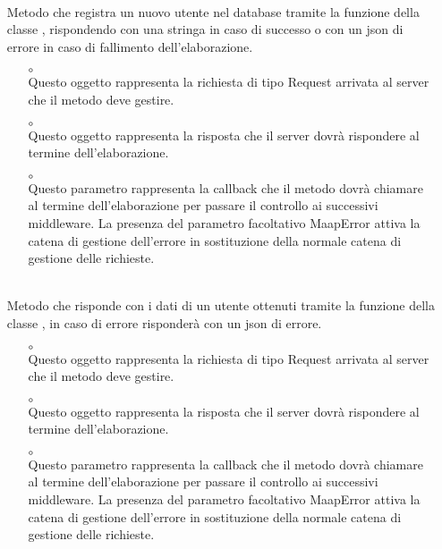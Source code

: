 \begin{itemize}
\begin{itemize}
\end{itemize}
\item[]  \\ Metodo che registra un nuovo utente nel database tramite la funzione  della classe , rispondendo con una stringa in caso di successo o con un json di errore in caso di fallimento dell'elaborazione.
\begin{itemize}\addtolength{\itemsep}{-0.5\baselineskip}
\item[$\circ$]  \\ Questo oggetto rappresenta la richiesta di tipo Request arrivata al server che il metodo deve gestire.
\item[$\circ$]  \\ Questo oggetto rappresenta la risposta che il server dovrà rispondere al termine dell'elaborazione.
\item[$\circ$]  \\ Questo parametro rappresenta la callback che il metodo dovrà chiamare al termine dell'elaborazione per passare il controllo ai successivi middleware. La presenza del parametro facoltativo MaapError attiva la catena di gestione dell'errore in sostituzione della normale catena di gestione delle richieste.
\end{itemize}
\item[]  \\ Metodo che risponde con i dati di un utente ottenuti tramite la funzione  della classe , in caso di errore risponderà con un json di errore.
\begin{itemize}\addtolength{\itemsep}{-0.5\baselineskip}
\item[$\circ$]  \\ Questo oggetto rappresenta la richiesta di tipo Request arrivata al server che il metodo deve gestire.
\item[$\circ$]  \\ Questo oggetto rappresenta la risposta che il server dovrà rispondere al termine dell'elaborazione.
\item[$\circ$]  \\ Questo parametro rappresenta la callback che il metodo dovrà chiamare al termine dell'elaborazione per passare il controllo ai successivi middleware. La presenza del parametro facoltativo MaapError attiva la catena di gestione dell'errore in sostituzione della normale catena di gestione delle richieste.

\end{itemize}
\end{itemize}

